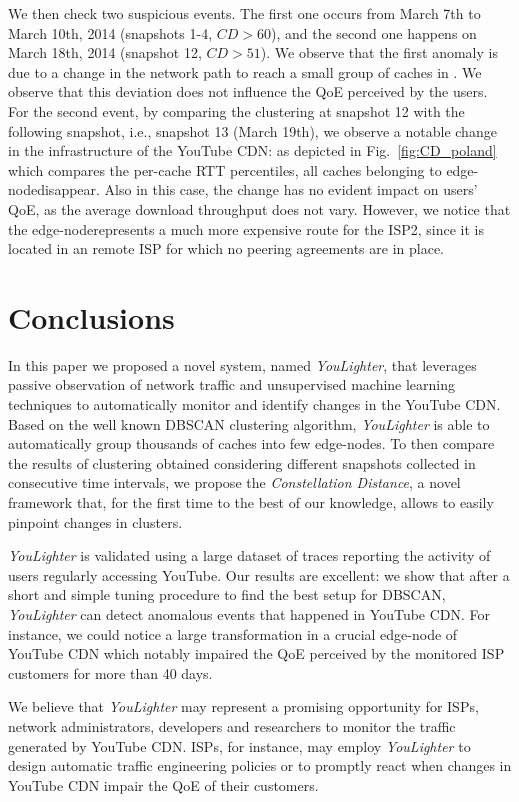 \documentclass{acm_proc_article-sp}
\newcommand{\tool}{\textit{YouLighter}\xspace}
\newcommand{\distance}{\textit{Constellation Distance}\xspace}
\newcommand{\node}{{edge-node}\xspace}
\newcommand{\nodes}{{edge-nodes}\xspace}
\begin{document}
We then check two suspicious events. The first one occurs from March 7th to March 10th, 2014 (snapshots 1-4, $CD>60$), and the second one happens on March 18th, 2014 (snapshot 12, $CD>51$). We observe that the first anomaly is due to a change in the network path to reach a small group of caches in \FRA. We observe that this deviation does not influence the QoE perceived by the users. For the second event, by comparing the clustering at snapshot 12 with the following snapshot, i.e., snapshot 13 (March 19th), we observe a notable change in the infrastructure of the YouTube CDN: as depicted in Fig.~\ref{fig:CD_poland} which compares the per-cache RTT percentiles, all caches belonging to \node \MAD disappear. Also in this case, the change has no evident impact on users' QoE, as the average download throughput does not vary. However, we notice that the \node \MAD represents a much more expensive route for the ISP2, since it is located in an remote ISP for which no peering agreements are in place.




\section{Conclusions}
\label{sec:conclu}

In this paper we proposed a novel system, named \tool, that leverages passive observation of network traffic and unsupervised machine learning techniques to automatically monitor and identify changes in the YouTube CDN. Based on the well known DBSCAN clustering algorithm, \tool is able to automatically group thousands of caches into few \nodes. 
To then compare the results of clustering obtained considering different snapshots collected in consecutive time intervals, we propose the \distance, a novel framework that, for the first time to the best of our knowledge, allows to easily pinpoint changes in clusters.

\tool is validated using a large dataset of traces reporting the activity of users regularly accessing YouTube. Our results are excellent: we show that after a short and simple tuning procedure to find the best setup for DBSCAN, \tool can detect anomalous events that happened in YouTube CDN. For instance, we could notice a large transformation in a crucial \node of YouTube CDN which notably impaired the QoE perceived by the monitored ISP customers for more than 40 days. 

We believe that \tool may represent a promising opportunity for ISPs, network administrators, developers and researchers to monitor the traffic generated by YouTube CDN. ISPs, for instance, may employ \tool to design automatic traffic engineering policies or to promptly react when changes in YouTube CDN impair the QoE of their customers.
\end{document}
